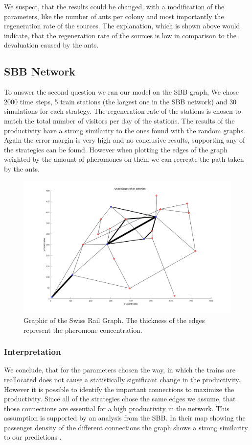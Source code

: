 We suspect, that the results could be changed, with a modification of the parameters, like the number of ants per colony and most importantly the regeneration rate of the sources. The explanation, which is shown above would indicate, that the regeneration rate of the sources is low in comparison to the devaluation caused by the ants.

\subsection{SBB Network}
To answer the second question we ran our model on the SBB graph, We chose 2000 time steps, 5 train stations (the largest one in the SBB network) and 30 simulations for each strategy. The regeneration rate of the stations is chosen to match the total number of visitors per day of the stations. The results of the productivity have a strong similarity to the ones found with the random graphs. Again the error margin is very high and no conclusive results, supporting any of the strategies can be found. However when plotting the edges of the graph weighted by the amount of pheromones on them we can recreate the path taken by the ants.
\begin{figure}[H]
	\centering
	\includegraphics[scale=0.7]{sbbWeighted.pdf}
 	\caption{Graphic of the Swiss Rail Graph. The thickness of the edges represent the pheromone concentration.}
\end{figure}

\subsubsection{Interpretation}
We conclude, that for the parameters chosen the way, in which the trains are reallocated does not cause a statistically significant change in the productivity. However it is possible to identify the important connections to maximize the productivity. Since all of the strategies chose the same edges we assume, that those connections are essential for a high productivity in the network. This assumption is supported by an analysis from the SBB. In their map showing the passenger density of the different connections the graph shows a strong similarity to our predictions \citep{SbbStats4}. 